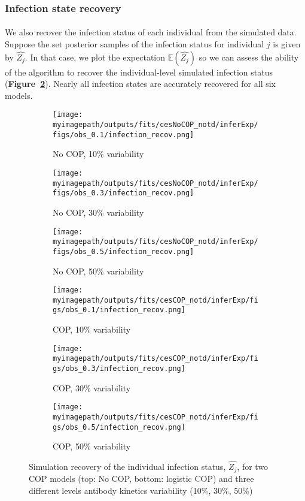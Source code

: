 \subsubsection{Infection state recovery}

\paragraph{}We also recover the infection status of each individual from the simulated data. Suppose the set posterior samples of the infection status for individual $j$ is given by $\hat{Z_j} $. In that case, we plot the expectation $\mathbb{E}(\hat{Z_j} )$ so we can assess the ability of the algorithm to recover the individual-level simulated infection status (\textbf{Figure~\ref{fit2:inf}}). Nearly all infection states are accurately recovered for all six models. 

\begin{figure}[H]
    \centering
    \begin{subfigure}{0.31\textwidth}
        \centering
        \texttt{[image: \\myimagepath/outputs/fits/cesNoCOP\_notd/inferExp/figs/obs\_0.1/infection\_recov.png]}
        \caption{No COP, 10\% variability \label{fit1:inf}}
    \end{subfigure}
    \begin{subfigure}{0.31\textwidth}
        \centering
        \texttt{[image: \\myimagepath/outputs/fits/cesNoCOP\_notd/inferExp/figs/obs\_0.3/infection\_recov.png]}
        \caption{No COP, 30\% variability}
    \end{subfigure}
    \begin{subfigure}{0.31\textwidth}
        \centering
        \texttt{[image: \\myimagepath/outputs/fits/cesNoCOP\_notd/inferExp/figs/obs\_0.5/infection\_recov.png]}
        \caption{No COP, 50\% variability}
    \end{subfigure}
    
  \begin{subfigure}{0.31\textwidth}
        \centering
        \texttt{[image: \\myimagepath/outputs/fits/cesCOP\_notd/inferExp/figs/obs\_0.1/infection\_recov.png]}
        \caption{ COP, 10\% variability}
    \end{subfigure}
    \begin{subfigure}{0.31\textwidth}
        \centering
        \texttt{[image: \\myimagepath/outputs/fits/cesCOP\_notd/inferExp/figs/obs\_0.3/infection\_recov.png]}
        \caption{ COP, 30\% variability}
    \end{subfigure}
    \begin{subfigure}{0.31\textwidth}
        \centering
        \texttt{[image: \\myimagepath/outputs/fits/cesCOP\_notd/inferExp/figs/obs\_0.5/infection\_recov.png]}
        \caption{ COP, 50\% variability}
    \end{subfigure}
    
    \caption{Simulation recovery of the individual infection status, $\hat{Z_j}$, for two COP models (top: No COP, bottom: logistic COP) and three different levels antibody kinetics variability (10\%, 30\%, 50\%) \label{fit2:inf}}
\end{figure}

